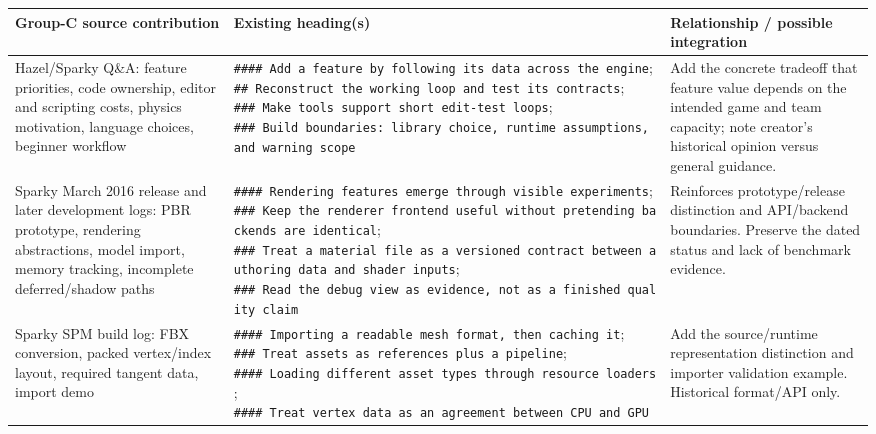 {\def\LTcaptype{none} %
\begin{longtable}[]{@{}
  >{\raggedright\arraybackslash}p{}
  >{\raggedright\arraybackslash}p{}
  >{\raggedright\arraybackslash}p{}@{}}
\toprule\noalign{}
\begin{minipage}[b]{\linewidth}\raggedright
Group-C source contribution
\end{minipage} & \begin{minipage}[b]{\linewidth}\raggedright
Existing heading(s)
\end{minipage} & \begin{minipage}[b]{\linewidth}\raggedright
Relationship / possible integration
\end{minipage} \\
\midrule\noalign{}
\endhead
\bottomrule\noalign{}
\endlastfoot
Hazel/Sparky Q\&A: feature priorities, code ownership, editor and scripting costs, physics motivation, language choices, beginner workflow & \texttt{\#\#\#\#\ Add\ a\ feature\ by\ following\ its\ data\ across\ the\ engine}; \texttt{\#\#\ Reconstruct\ the\ working\ loop\ and\ test\ its\ contracts}; \texttt{\#\#\#\ Make\ tools\ support\ short\ edit-test\ loops}; \texttt{\#\#\#\ Build\ boundaries:\ library\ choice,\ runtime\ assumptions,\ and\ warning\ scope} & Add the concrete tradeoff that feature value depends on the intended game and team capacity; note creator's historical opinion versus general guidance. \\
Sparky March 2016 release and later development logs: PBR prototype, rendering abstractions, model import, memory tracking, incomplete deferred/shadow paths & \texttt{\#\#\#\#\ Rendering\ features\ emerge\ through\ visible\ experiments}; \texttt{\#\#\#\ Keep\ the\ renderer\ frontend\ useful\ without\ pretending\ backends\ are\ identical}; \texttt{\#\#\#\ Treat\ a\ material\ file\ as\ a\ versioned\ contract\ between\ authoring\ data\ and\ shader\ inputs}; \texttt{\#\#\#\ Read\ the\ debug\ view\ as\ evidence,\ not\ as\ a\ finished\ quality\ claim} & Reinforces prototype/release distinction and API/backend boundaries. Preserve the dated status and lack of benchmark evidence. \\
Sparky SPM build log: FBX conversion, packed vertex/index layout, required tangent data, import demo & \texttt{\#\#\#\#\ Importing\ a\ readable\ mesh\ format,\ then\ caching\ it}; \texttt{\#\#\#\ Treat\ assets\ as\ references\ plus\ a\ pipeline}; \texttt{\#\#\#\#\ Loading\ different\ asset\ types\ through\ resource\ loaders}; \texttt{\#\#\#\#\ Treat\ vertex\ data\ as\ an\ agreement\ between\ CPU\ and\ GPU} & Add the source/runtime representation distinction and importer validation example. Historical format/API only. \\

\end{longtable}}
